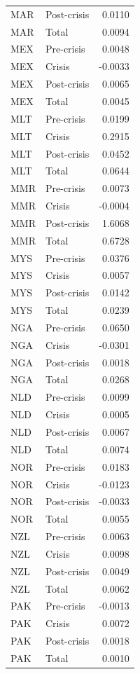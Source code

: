 \begin{longtable}[t]{llr}
MAR & Post-crisis & 0.0110\\
MAR & Total & 0.0094\\
MEX & Pre-crisis & 0.0048\\
MEX & Crisis & -0.0033\\
\addlinespace
MEX & Post-crisis & 0.0065\\
MEX & Total & 0.0045\\
MLT & Pre-crisis & 0.0199\\
MLT & Crisis & 0.2915\\
MLT & Post-crisis & 0.0452\\
\addlinespace
MLT & Total & 0.0644\\
MMR & Pre-crisis & 0.0073\\
MMR & Crisis & -0.0004\\
MMR & Post-crisis & 1.6068\\
MMR & Total & 0.6728\\
\addlinespace
MYS & Pre-crisis & 0.0376\\
MYS & Crisis & 0.0057\\
MYS & Post-crisis & 0.0142\\
MYS & Total & 0.0239\\
NGA & Pre-crisis & 0.0650\\
\addlinespace
NGA & Crisis & -0.0301\\
NGA & Post-crisis & 0.0018\\
NGA & Total & 0.0268\\
NLD & Pre-crisis & 0.0099\\
NLD & Crisis & 0.0005\\
\addlinespace
NLD & Post-crisis & 0.0067\\
NLD & Total & 0.0074\\
NOR & Pre-crisis & 0.0183\\
NOR & Crisis & -0.0123\\
NOR & Post-crisis & -0.0033\\
\addlinespace
NOR & Total & 0.0055\\
NZL & Pre-crisis & 0.0063\\
NZL & Crisis & 0.0098\\
NZL & Post-crisis & 0.0049\\
NZL & Total & 0.0062\\
\addlinespace
PAK & Pre-crisis & -0.0013\\
PAK & Crisis & 0.0072\\
PAK & Post-crisis & 0.0018\\
PAK & Total & 0.0010\\

\end{longtable}
